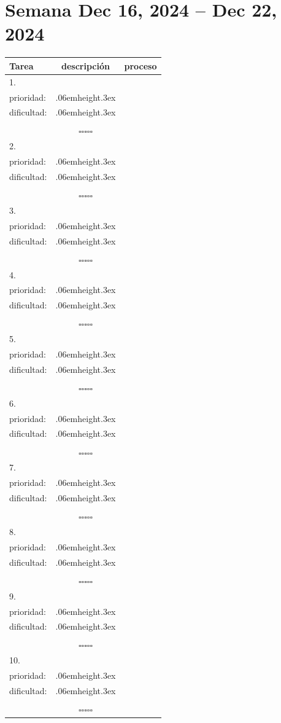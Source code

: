 \documentclass[a4paper,12pt, tikz]{scrartcl}
\newcommand\Vtextvisiblespace[1][.3em]{%
  \mbox{\kern.06em\vrule height.3ex}%
  \vbox{\hrule width#1}%
  \hbox{\vrule height.3ex}}
\newcommand{\subtablaDescrip}{ \begin{tabular}{ll}&\\ prioridad: & \Vtextvisiblespace[2em] \\ dificultad: & \Vtextvisiblespace[2em]\\&\\ \end{tabular}}
\begin{document}
\section*{Semana Dec 16, 2024 -- Dec 22, 2024}
\thispagestyle{empty}
\noindent
\begin{tabularx}{\linewidth}{|X|c c|}
    \hline
  \textbf{Tarea} & \textbf{descripción} & \textbf{proceso}\\
  \hline
   1.\vspace{4ex} &      \subtablaDescrip     & $\square\square\square\square\square$ \\
  \hline
  2.\vspace{4ex} &      \subtablaDescrip     & $\square\square\square\square\square$ \\
  \hline
  3.\vspace{4ex} &      \subtablaDescrip     & $\square\square\square\square\square$ \\
  \hline
  4.\vspace{4ex} &      \subtablaDescrip     & $\square\square\square\square\square$ \\
  \hline
  5.\vspace{4ex} &      \subtablaDescrip     & $\square\square\square\square\square$ \\
  \hline
  6.\vspace{4ex} &      \subtablaDescrip     & $\square\square\square\square\square$ \\
  \hline
  7.\vspace{4ex} &      \subtablaDescrip     & $\square\square\square\square\square$ \\
  \hline
  8.\vspace{4ex} &      \subtablaDescrip     & $\square\square\square\square\square$ \\
  \hline
  9.\vspace{4ex} &      \subtablaDescrip     & $\square\square\square\square\square$ \\
  \hline
  10.\vspace{4ex} &      \subtablaDescrip     & $\square\square\square\square\square$ \\
  \hline
\end{tabularx}

\newpage
\end{document}
